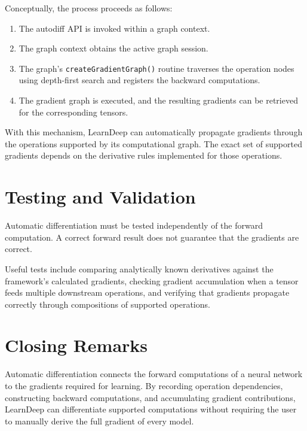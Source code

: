 Conceptually, the process proceeds as follows:

\begin{enumerate}
    \item The autodiff API is invoked within a graph context.
    \item The graph context obtains the active graph session.
    \item The graph's \texttt{createGradientGraph()} routine traverses the operation nodes using depth-first search and registers the backward computations.
    \item The gradient graph is executed, and the resulting gradients can be retrieved for the corresponding tensors.
\end{enumerate}

With this mechanism, LearnDeep can automatically propagate gradients through the operations supported by its computational graph. The exact set of supported gradients depends on the derivative rules implemented for those operations.

\section{Testing and Validation}

Automatic differentiation must be tested independently of the forward computation. A correct forward result does not guarantee that the gradients are correct.

Useful tests include comparing analytically known derivatives against the framework's calculated gradients, checking gradient accumulation when a tensor feeds multiple downstream operations, and verifying that gradients propagate correctly through compositions of supported operations.

%

\section{Closing Remarks}

Automatic differentiation connects the forward computations of a neural network to the gradients required for learning. By recording operation dependencies, constructing backward computations, and accumulating gradient contributions, LearnDeep can differentiate supported computations without requiring the user to manually derive the full gradient of every model.

